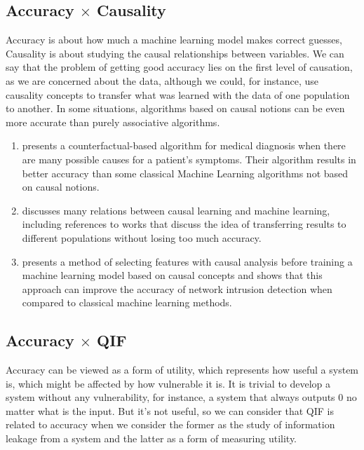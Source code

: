 \subsection{Accuracy $\times$ Causality}

Accuracy is about how much a machine learning model makes correct guesses, Causality is about studying the causal relationships between variables. We can say that the problem of getting good accuracy lies on the first level of causation, as we are concerned about the data, although we could, for instance, use causality concepts to transfer what was learned with the data of one population to another. In some situations, algorithms based on causal notions can be even more accurate than purely associative algorithms.

\begin{enumerate}
    \item \cite{richens2020improving} presents a counterfactual-based algorithm for medical diagnosis when there are many possible causes for a patient's symptoms. Their algorithm results in better accuracy than some classical Machine Learning algorithms not based on causal notions.
    \item \cite{scholkopf2022causality} discusses many relations between causal learning and machine learning, including references to works that discuss the idea of transferring results to different populations without losing too much accuracy.
    \item \cite{zeng2021improving} presents a method of selecting features with causal analysis before training a machine learning model based on causal concepts and shows that this approach can improve the accuracy of network intrusion detection when compared to classical machine learning methods.
\end{enumerate}

\subsection{Accuracy $\times$ QIF}

Accuracy can be viewed as a form of utility, which represents how useful a system is, which might be affected by how vulnerable it is. It is trivial to develop a system without any vulnerability, for instance, a system that always outputs $0$ no matter what is the input. But it's not useful, so we can consider that QIF is related to accuracy when we consider the former as the study of information leakage from a system and the latter as a form of measuring utility.

